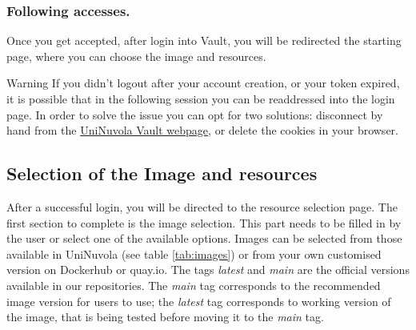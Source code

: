 \subsubsection{Following accesses.}
Once you get accepted, after login into Vault, you will be redirected the  starting page, where you can choose the image and resources.

\begin{bclogo}[logo=\bcinfo, couleurBarre=orange, noborder=true, couleur=white]{Warning}
If you didn't logout after your account creation, or your token expired, it is possible that in the following session
you can be readdressed into the login page.  In order to solve the issue you can opt for two solutions:  disconnect by hand from the \href{https://vault.uninuvola.unipg.it:8200/ui/vault/dashboard}{UniNuvola Vault webpage}, or delete the cookies in your browser.

\end{bclogo}


\subsection{Selection of the Image and resources}

After a successful login, you will be directed to the resource selection page. The first section to complete is the
image selection. This part needs to be filled in by the user or select one of the available options. Images can be
selected from those available in UniNuvola (see table \ref{tab:images}) or from your own customised version on
Dockerhub or quay.io. The tags \textit{latest} and \textit{main} are the official versions available in our repositories. The \textit{main} tag corresponds to the recommended image version for users to use; the \textit{latest} tag  corresponds to working version of the image, that is being tested before moving it to the \textit{main} tag.\\

